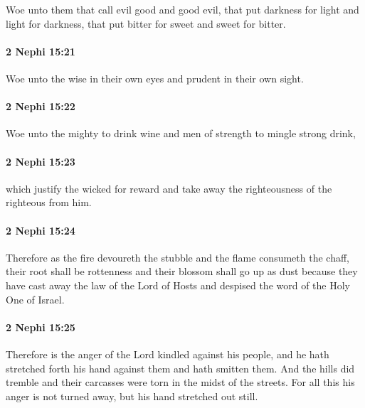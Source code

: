 			Woe unto them that call evil good and good evil,
			that put darkness for light and light for darkness,
			that put bitter for sweet and sweet for bitter.

		\paragraph{2 Nephi 15:21} %
			\label{2NEPHI-15-21}

			Woe unto the wise in their own eyes and prudent in their own sight.

		\paragraph{2 Nephi 15:22} %
			\label{2NEPHI-15-22}

			Woe unto the mighty to drink wine
			and men of strength to mingle strong drink,

		\paragraph{2 Nephi 15:23} %
			\label{2NEPHI-15-23}

			which justify the wicked for reward
			and take away the righteousness of the righteous from him.

		\paragraph{2 Nephi 15:24} %
			\label{2NEPHI-15-24}

			Therefore as the fire devoureth the stubble and the flame consumeth the chaff,
			their root shall be rottenness and their blossom shall go up as dust
			because they have cast away the law of the Lord of Hosts
			and despised the word of the Holy One of Israel.

		\paragraph{2 Nephi 15:25} %
			\label{2NEPHI-15-25}

			Therefore is the anger of the Lord kindled against his people,
			and he hath stretched forth his hand against them and hath smitten them.
			And the hills did tremble and their carcasses were torn in the midst of the streets.
			For all this his anger is not turned away, but his hand stretched out still.

